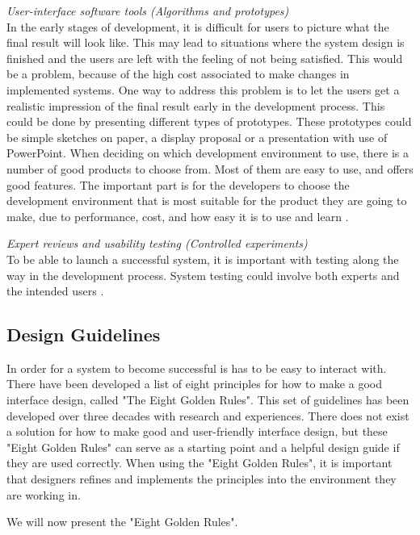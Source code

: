 \emph{User-interface software tools (Algorithms and prototypes)}\\
In the early stages of development, it is difficult for users to picture what the final result will look like. This may lead to situations where the system design is finished and the users are left with the feeling of not being satisfied. This would be a problem, because of the high cost associated to make changes in implemented systems. One way to address this problem is to let the users get a realistic impression of the final result early in the development process. This could be done by presenting different types of prototypes. These prototypes could be simple sketches on paper, a display proposal or a presentation with use of PowerPoint. When deciding on which development environment to use, there is a number of good products to choose from. Most of them are easy to use, and offers good features. The important part is for the developers to choose the development environment that is most suitable for the product they are going to make, due to performance, cost, and how easy it is to use and learn \cite{mmi}.
	
\emph{Expert reviews and usability testing (Controlled experiments)}\\
To be able to launch a successful system, it is important with testing along the way in the development process. System testing could involve both experts and the intended users \cite{mmi}. 

\subsection{Design Guidelines}
In order for a system to become successful is has to be easy to interact with. There have been developed a list of eight principles for how to make a good interface design, called "The Eight Golden Rules". This set of guidelines has been developed over three decades with research and experiences. There does not exist a solution for how to make good and user-friendly interface design, but these "Eight Golden Rules" can serve as a starting point and a helpful design guide if they are used correctly. When using the "Eight Golden Rules", it is important that designers refines and implements the principles into the environment they are working in. 

We will now present the "Eight Golden Rules".

